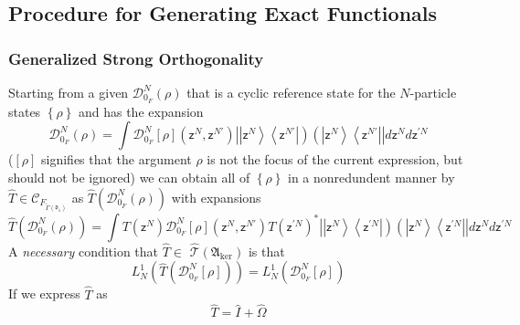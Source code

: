 \documentclass[aps,preprint]{revtex4}%
\begin{document}
\subsection{Procedure for Generating Exact Functionals}

\subsubsection{Generalized Strong Orthogonality}

Starting from a given $\mathcal{D}_{0_{F}}^{N}\left(  \rho\right)  $ that is a
cyclic reference state for the $N$-particle states $\left\{  \rho\right\}  $
and has the expansion
\begin{equation}
\mathcal{D}_{0_{F}}^{N}\left(  \rho\right)  =\int\mathcal{D}_{0_{F}}%
^{N}\left[  \rho\right]  \left(  \mathsf{z}^{N},\mathsf{z}^{N\prime}\right)
\left\vert \left\vert \mathsf{z}^{N}\right\rangle \left\langle \mathsf{z}%
^{N\prime}\right\vert \right)  \left(  \left\vert \mathsf{z}^{N}\right\rangle
\left\langle \mathsf{z}^{N\prime}\right\vert \right\vert d\mathsf{z}%
^{N}d\mathsf{z}^{\prime N}%
\end{equation}
($\left[  \rho\right]  $ signifies that the argument $\rho$ is not the focus
of the current expression, but should not be ignored) we can obtain all of
$\left\{  \rho\right\}  $ in a nonredundent manner by $\hat{T}\in
\mathcal{C}_{F_{\tilde{\Gamma}\left(  \mathfrak{d}_{1}\right)  }}$ as $\hat
{T}\left(  \mathcal{D}_{0_{F}}^{N}\left(  \rho\right)  \right)  $ with
expansions
\begin{equation}
\hat{T}\left(  \mathcal{D}_{0_{F}}^{N}\left(  \rho\right)  \right)  =\int
T\left(  \mathsf{z}^{N}\right)  \mathcal{D}_{0_{F}}^{N}\left[  \rho\right]
\left(  \mathsf{z}^{N},\mathsf{z}^{N\prime}\right)  T\left(  \mathsf{z}%
^{\prime N}\right)  ^{\ast}\left\vert \left\vert \mathsf{z}^{N}\right\rangle
\left\langle \mathsf{z}^{\prime N}\right\vert \right)  \left(  \left\vert
\mathsf{z}^{N}\right\rangle \left\langle \mathsf{z}^{\prime N}\right\vert
\right\vert d\mathsf{z}^{N}d\mathsf{z}^{\prime N}%
\end{equation}
A \emph{necessary} condition that $\hat{T}\in$ $\mathcal{\hat{T}}\left(
\mathfrak{A}_{\ker}\right)  $ is that
\begin{equation}
L_{N}^{1}\left(  \hat{T}\left(  \mathcal{D}_{0_{F}}^{N}\left[  \rho\right]
\right)  \right)  =L_{N}^{1}\left(  \mathcal{D}_{0_{F}}^{N}\left[
\rho\right]  \right)
\end{equation}
If we express $\hat{T}$ as
\begin{equation}
\hat{T}=\hat{I}+\hat{\Omega}%
\end{equation}
\end{document}
